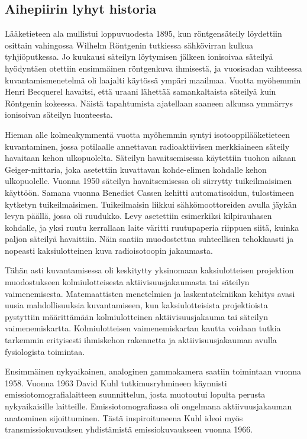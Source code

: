 \subsection{Aihepiirin lyhyt historia}
Lääketieteen ala mullistui loppuvuodesta 1895, kun röntgensäteily löydettiin osittain vahingossa Wilhelm Röntgenin tutkiessa sähkövirran kulkua tyhjiöputkessa. Jo kuukausi säteilyn löytymisen jälkeen ionisoivaa säteilyä hyödyntäen otettiin ensimmäinen röntgenkuva ihmisestä, ja vuosisadan vaihteessa kuvantamismenetelmä oli laajalti käytössä ympäri maailmaa.\cite{bercovich_medical_2018, cherry_basic_2012} Vuotta myöhemmin Henri Becquerel havaitsi, että uraani lähettää samankaltaista säteilyä kuin Röntgenin kokeessa. Näistä tapahtumista ajatellaan saaneen alkunsa ymmärrys ionisoivan säteilyn luonteesta.\cite{cherry_basic_2012}

Hieman alle kolmeakymmentä vuotta myöhemmin syntyi isotooppilääketieteen kuvantaminen, jossa potilaalle annettavan radioaktiivisen merkkiaineen säteily havaitaan kehon ulkopuolelta. Säteilyn havaitsemisessa käytettiin tuohon aikaan Geiger-mittaria, joka asetettiin kuvattavan kohde-elimen kohdalle kehon ulkopuolelle. Vuonna 1950 säteilyn havaitsemisessa oli siirrytty tuikeilmaisimen käyttöön. Samana vuonna Benedict Cassen kehitti automatisoidun, tulostimeen kytketyn tuikeilmaisimen. Tuikeilmaisin liikkui sähkömoottoreiden avulla jäykän levyn päällä, jossa oli ruudukko. Levy asetettiin esimerkiksi kilpirauhasen kohdalle, ja yksi ruutu kerrallaan laite väritti ruutupaperia riippuen siitä, kuinka paljon säteilyä havaittiin. Näin saatiin muodostettua suhteellisen tehokkaasti ja nopeasti kaksiulotteinen kuva radioisotoopin jakaumasta.\cite{jaszczak_early_2006, cherry_gamma_2012}

Tähän asti kuvantamisessa oli keskitytty yksinomaan kaksiulotteisen projektion muodostukseen kolmiulotteisesta aktiivisuusjakaumasta tai säteilyn vaimenemisesta. Matemaattisten menetelmien ja laskentatekniikan kehitys avasi uusia mahdollisuuksia kuvantamiseen, kun kaksiulotteisista projektioista pystyttiin määrittämään kolmiulotteinen aktiivisuusjakauma\cite{bercovich_medical_2018, cherry_single_2012} tai säteilyn vaimenemiskartta\cite{bercovich_medical_2018, stiller_basics_2018}. Kolmiulotteisen vaimenemiskartan kautta voidaan tutkia tarkemmin erityisesti ihmiskehon rakennetta ja aktiivisuusjakauman avulla fysiologista toimintaa.

Ensimmäinen nykyaikainen, analoginen gammakamera saatiin toimintaan vuonna 1958\cite{hutton_origins_2014, cherry_gamma_2012}. Vuonna 1963 David Kuhl tutkimusryhmineen käynnisti emissiotomografialaitteen suunnittelun, josta muotoutui lopulta perusta nykyaikaisille laitteille\cite{jaszczak_early_2006, hutton_origins_2014}. Emissiotomografiassa oli ongelmana aktiivuusjakauman anatominen sijoittuminen. Tästä inspiroituneena Kuhl ideoi myös transmissiokuvauksen yhdistämistä emissiokuvaukseen vuonna 1966\cite{jaszczak_early_2006}.

